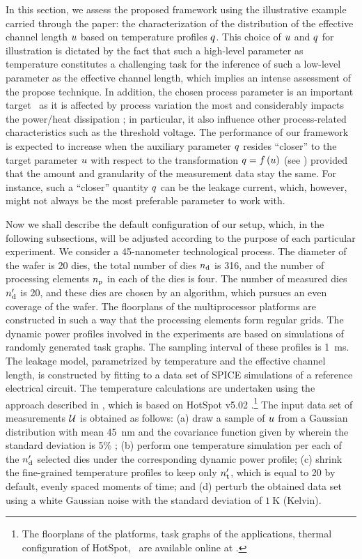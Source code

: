 
In this section, we assess the proposed framework using the illustrative example carried through the paper: the characterization of the distribution of the effective channel length $u$ based on temperature profiles $q$.
This choice of $u$ and $q$ for illustration is dictated by the fact that such a high-level parameter as temperature constitutes a challenging task for the inference of such a low-level parameter as the effective channel length, which implies an intense assessment of the propose technique.
In addition, the chosen process parameter is an important target \perse\ as it is affected by process variation the most and considerably impacts the power/heat dissipation \cite{chandrakasan2001, srivastava2010, juan2012}; in particular, it also influence other process-related characteristics such as the threshold voltage.
The performance of our framework is expected to increase when the auxiliary parameter $q$ resides ``closer'' to the target parameter $u$ with respect to the transformation $\q = \oBB{\u}$ (see ) provided that the amount and granularity of the measurement data stay the same.
For instance, such a ``closer'' quantity $q$ can be the leakage current, which, however, might not always be the most preferable parameter to work with.

Now we shall describe the default configuration of our setup, which, in the following subsections, will be adjusted according to the purpose of each particular experiment.
We consider a 45-nanometer technological process. The diameter of the wafer is 20 dies, the total number of dies ${n_\text{d}}$ is 316, and the number of processing elements ${n_\text{p}}$ in each of the dies is four.
The number of measured dies ${n_\text{d}'}$ is 20, and these dies are chosen by an algorithm, which pursues an even coverage of the wafer.
The floorplans of the multiprocessor platforms are constructed in such a way that the processing elements form regular grids.
The dynamic power profiles involved in the experiments are based on simulations of randomly generated task graphs.
The sampling interval of these profiles is 1~ms.
The leakage model, parametrized by temperature and the effective channel length, is constructed by fitting to a data set of SPICE simulations of a reference electrical circuit.
The temperature calculations are undertaken using the approach described in \cite{ukhov2012}, which is based on HotSpot v5.02 \cite{hotspot}.\footnote{The floorplans of the platforms, task graphs of the applications, thermal configuration of HotSpot, \etc\ are available online at \cite{sources}.}
The input data set of measurements $\mathcal{U}$ is obtained as follows: (a) draw a sample of $u$ from a Gaussian distribution with mean 45~nm and the covariance function given by  wherein the standard deviation is 5\% \cite{juan2012}; (b) perform one temperature simulation per each of the ${n_\text{d}'}$ selected dies under the corresponding dynamic power profile; (c) shrink the fine-grained temperature profiles to keep only ${n_\text{t}'}$, which is equal to 20 by default, evenly spaced moments of time; and (d) perturb the obtained data set using a white Gaussian noise with the standard deviation of $1~\text{K}$ (Kelvin).

